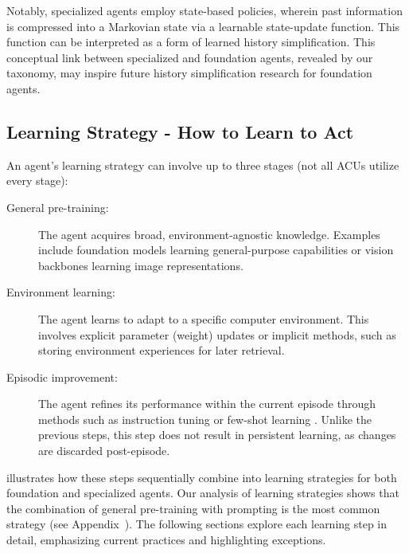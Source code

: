 Notably, specialized agents employ state-based policies, wherein past information is compressed into a Markovian state via a learnable state-update function.
This function can be interpreted as a form of learned history simplification.
This conceptual link between specialized and foundation agents, revealed by our taxonomy, may inspire future history simplification research for foundation agents.


\subsection{Learning Strategy - How to Learn to Act}\label{sec:learning_strategy}

An agent’s learning strategy can involve up to three stages (not all ACUs utilize every stage):

\begin{description}
    \item[General pre-training:] 
        The agent acquires broad, environment-agnostic knowledge. Examples include foundation models learning general-purpose capabilities or vision backbones learning image representations.
    \item[Environment learning:] 
        The agent learns to adapt to a specific computer environment. This involves explicit parameter (weight) updates or implicit methods, such as storing environment experiences for later retrieval.
    \item[Episodic improvement:] 
        The agent refines its performance within the current episode through methods such as instruction tuning or few-shot learning \citep{brown_language_2020}. Unlike the previous steps, this step does not result in persistent learning, as changes are discarded post-episode.
\end{description}

 illustrates how these steps sequentially combine into learning strategies for both foundation and specialized agents.
Our analysis of learning strategies shows that the combination of general pre-training with prompting is the most common strategy (see Appendix~).
The following sections explore each learning step in detail, emphasizing current practices and highlighting exceptions.

